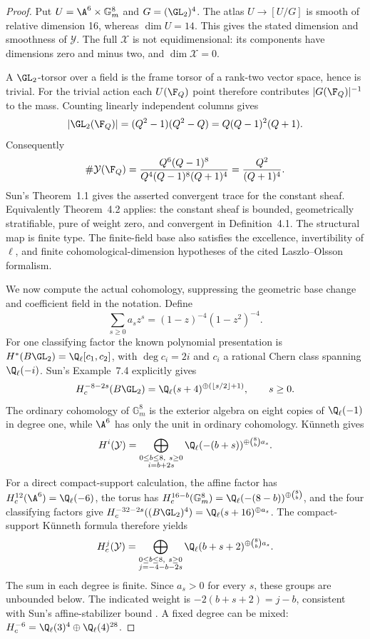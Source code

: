 \begin{proof}
Put $U=\A^6\times\mathbb G_m^8$ and $G=(\GL_2)^4$.
The atlas $U\to[U/G]$ is smooth of relative dimension 16, whereas
$\dim U=14$. This gives the stated dimension and smoothness of
$\mathcal Y$. The full $\mathcal X$ is not equidimensional: its
components have dimensions zero and minus two, and $\dim\mathcal X=0$.

A $\GL_2$-torsor over a field is the frame torsor of a rank-two
vector space, hence is trivial. For the trivial action each
$U(\F_Q)$ point therefore contributes $|G(\F_Q)|^{-1}$ to the mass.
Counting linearly independent columns gives
\[
 |\GL_2(\F_Q)|=(Q^2-1)(Q^2-Q)=Q(Q-1)^2(Q+1).
\]
Consequently
\[
 \#\mathcal Y(\F_Q)
 =\frac{Q^6(Q-1)^8}{Q^4(Q-1)^8(Q+1)^4}
 =\frac{Q^2}{(Q+1)^4}.
\]
Sun's Theorem~1.1 gives the asserted convergent trace for the constant
sheaf. Equivalently Theorem~4.2 applies: the constant sheaf is
bounded, geometrically stratifiable, pure of weight zero, and
convergent in Definition~4.1. The structural map is finite type.
The finite-field base also satisfies the excellence, invertibility
of $\ell$, and finite cohomological-dimension hypotheses of the
cited Laszlo--Olsson formalism.

We now compute the actual cohomology, suppressing the geometric
base change and coefficient field in the notation. Define
\[
 \sum_{s\ge0}a_s z^s=(1-z)^{-4}(1-z^2)^{-4}.
\]
For one classifying factor the known polynomial presentation is
$H^*(B\GL_2)=\Q_\ell[c_1,c_2]$, with $\deg c_i=2i$ and
$c_i$ a rational Chern class spanning $\Q_\ell(-i)$.
Sun's Example~7.4 explicitly gives
\[
 H_c^{-8-2s}(B\GL_2)
 =\Q_\ell(s+4)^{\oplus(\lfloor s/2\rfloor+1)},\qquad s\ge0.
\]
The ordinary cohomology of $\mathbb G_m^8$ is the exterior
algebra on eight copies of $\Q_\ell(-1)$ in degree one, while
$\A^6$ has only the unit in ordinary cohomology. K\"unneth gives
\begin{equation}\label{eq:stackordinarygroups}
 H^i(\mathcal Y)=
 \bigoplus_{\substack{0\le b\le8,\ s\ge0\\i=b+2s}}
 \Q_\ell(-(b+s))^{\oplus\binom8b a_s}.
\end{equation}
For a direct compact-support calculation, the affine factor has
$H_c^{12}(\A^6)=\Q_\ell(-6)$, the torus has
$H_c^{16-b}(\mathbb G_m^8)=\Q_\ell(-(8-b))^{\oplus\binom8b}$,
and the four classifying factors give
$H_c^{-32-2s}((B\GL_2)^4)=\Q_\ell(s+16)^{\oplus a_s}$.
The compact-support K\"unneth formula therefore yields
\begin{equation}\label{eq:stackcompactgroups}
 H_c^j(\mathcal Y)=
 \bigoplus_{\substack{0\le b\le8,\ s\ge0\\j=-4-b-2s}}
 \Q_\ell(b+s+2)^{\oplus\binom8b a_s}.
\end{equation}
The sum in each degree is finite. Since $a_s>0$ for every $s$,
these groups are unbounded below. The indicated weight is
$-2(b+s+2)=j-b$, consistent with Sun's affine-stabilizer bound
\cite[Theorem~1.4, p.~50]{SunStacks}. A fixed degree can be mixed:
$H_c^{-6}=\Q_\ell(3)^4\oplus\Q_\ell(4)^{28}$.


\end{proof}
